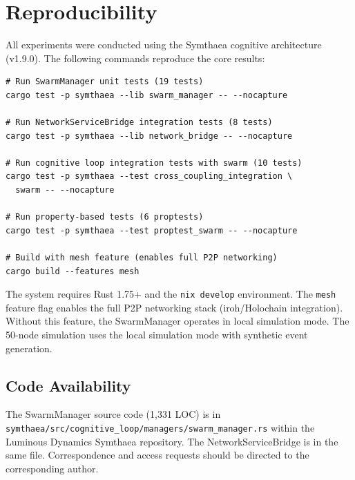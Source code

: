 \documentclass[11pt,a4paper]{article}
\begin{document}
\section{Reproducibility}

All experiments were conducted using the Symthaea cognitive architecture (v1.9.0). The following commands reproduce the core results:

\begin{verbatim}
# Run SwarmManager unit tests (19 tests)
cargo test -p symthaea --lib swarm_manager -- --nocapture

# Run NetworkServiceBridge integration tests (8 tests)
cargo test -p symthaea --lib network_bridge -- --nocapture

# Run cognitive loop integration tests with swarm (10 tests)
cargo test -p symthaea --test cross_coupling_integration \
  swarm -- --nocapture

# Run property-based tests (6 proptests)
cargo test -p symthaea --test proptest_swarm -- --nocapture

# Build with mesh feature (enables full P2P networking)
cargo build --features mesh
\end{verbatim}

The system requires Rust 1.75+ and the \texttt{nix develop} environment. The \texttt{mesh} feature flag enables the full P2P networking stack (iroh/Holochain integration). Without this feature, the SwarmManager operates in local simulation mode. The 50-node simulation uses the local simulation mode with synthetic event generation.

\subsection*{Code Availability}

The SwarmManager source code (1,331 LOC) is in \texttt{symthaea/src/cognitive\_loop/managers/swarm\_manager.rs} within the Luminous Dynamics Symthaea repository. The NetworkServiceBridge is in the same file. Correspondence and access requests should be directed to the corresponding author.
\end{document}
